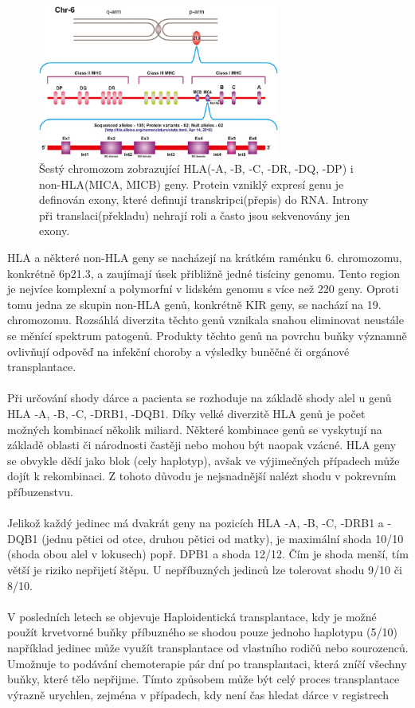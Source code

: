 \documentclass[czech,DP]{thesiskiv}
\numberwithin{equation}{section}
\begin{document}
\begin{figure}[H]		
		\centering
		\includegraphics[width=300px]{./img/genom6_mica.jpg}
		\caption{Šestý chromozom zobrazující HLA(-A, -B, -C, -DR, -DQ, -DP) i non-HLA(MICA, MICB) geny. Protein vzniklý expresí genu je definován exony, které definují transkripci(přepis) do RNA. Introny při translaci(překladu) nehrají roli a často jsou sekvenovány jen exony. \cite{chromozome6_mica} 
		}
		\label{fig:hla_genome}
\end{figure}

\noindent
HLA a některé non-HLA geny se nacházejí na krátkém raménku 6. chromozomu, konkrétně 6p21.3, a zaujímají úsek přibližně jedné tisíciny genomu. Tento region je nejvíce komplexní a polymorfní v lidském genomu s více než 220 geny. Oproti tomu jedna ze skupin non-HLA genů, konkrétně KIR geny, se nachází na 19. chromozomu. Rozsáhlá diverzita těchto genů vznikala snahou eliminovat neustále se měnící spektrum patogenů. Produkty těchto genů na povrchu buňky významně ovlivňují odpověď na infekční choroby a výsledky buněčné či orgánové transplantace. \cite{imgt_hla_database}
\\
\\
Při určování shody dárce a pacienta se rozhoduje na základě shody alel u genů HLA -A, -B, -C, -DRB1, -DQB1. Díky velké diverzitě HLA genů je počet možných kombinací několik miliard. Některé kombinace genů se vyskytují na základě oblasti či národnosti častěji nebo mohou být naopak vzácné. HLA geny se obvykle dědí jako blok (cely haplotyp), avšak ve výjimečných případech může dojít k rekombinaci. Z tohoto důvodu je nejsnadnější nalézt shodu v pokrevním příbuzenstvu.
\\
\\
Jelikož každý jedinec má dvakrát geny na pozicích HLA -A, -B, -C, -DRB1 a -DQB1 (jednu pětici od otce, druhou pětici od matky), je maximální shoda 10/10 (shoda obou alel v lokusech) popř. DPB1 a shoda 12/12. Čím je shoda menší, tím větší je riziko nepřijetí štěpu. U nepříbuzných jedinců lze tolerovat shodu 9/10 či 8/10. \cite{Frycova_bakalarka} \cite{KIR_transplantace_jindra}
\\
\\
V posledních letech se objevuje Haploidentická transplantace, kdy je možné použít krvetvorné buňky příbuzného se shodou pouze jednoho haplotypu (5/10) například jedinec může využít transplantace od vlastního rodičů nebo sourozenců. Umožnuje to podávání chemoterapie pár dní po transplantaci, která zníčí všechny buňky, které tělo nepřijme. Tímto způsobem může být celý proces transplantace výrazně urychlen, zejména v případech, kdy není čas hledat dárce v registrech \cite{haploidenticka_transplantace}
\end{document}
